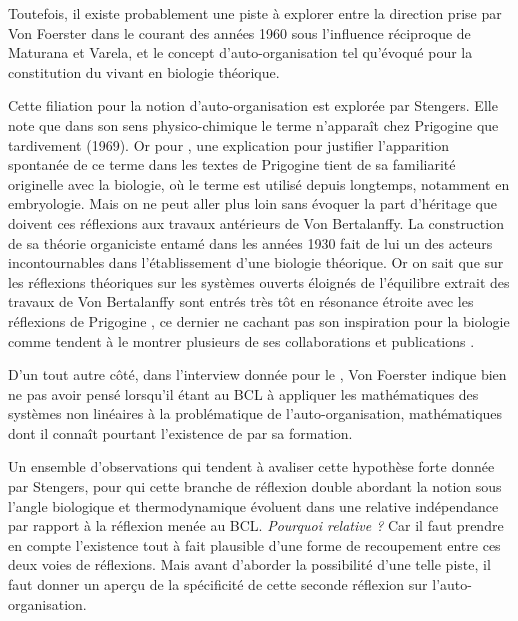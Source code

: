 Toutefois, il existe probablement une piste à explorer entre la direction prise par Von Foerster dans le courant des années 1960 sous l'influence réciproque de Maturana et Varela, et le concept d'auto-organisation tel qu'évoqué pour la constitution du vivant en biologie théorique. 

Cette filiation pour la notion d'auto-organisation est explorée par Stengers. Elle note que dans son sens physico-chimique le terme n’apparaît chez Prigogine que tardivement (1969). Or pour \textcite[64]{Stengers1985}, une explication pour justifier l'apparition spontanée de ce terme dans les textes de Prigogine tient de sa familiarité originelle avec la biologie, où le terme est utilisé depuis longtemps, notamment en embryologie. Mais on ne peut aller plus loin sans évoquer la part d'héritage que doivent ces réflexions aux travaux antérieurs de Von Bertalanffy. La construction de sa théorie organiciste  entamé dans les années 1930 fait de lui un des acteurs incontournables dans l'établissement d'une biologie théorique. Or on sait que sur les réflexions théoriques sur les systèmes ouverts éloignés de l'équilibre extrait des travaux de Von Bertalanffy sont entrés très tôt en résonance étroite \autocite[653-661]{Pouvreau2013} avec les réflexions de Prigogine \autocite{Prigogine1996}, ce dernier ne cachant pas son inspiration pour la biologie comme tendent à le montrer plusieurs de ses collaborations et publications \autocites[59-67]{Stengers1985}{Prigogine1946}.

D'un tout autre côté, dans l'interview donnée pour le \textcite[255]{CREA1985}, Von Foerster indique bien ne pas avoir pensé lorsqu'il étant au BCL à appliquer les mathématiques des systèmes non linéaires à la problématique de l'auto-organisation, mathématiques dont il connaît pourtant l'existence de par sa formation.


Un ensemble d'observations qui tendent à avaliser cette hypothèse forte donnée par Stengers, pour qui cette branche de réflexion double abordant la notion sous l'angle biologique et thermodynamique évoluent dans une relative indépendance par rapport à la réflexion menée au BCL. \textit{Pourquoi relative ?} Car il faut prendre en compte l'existence tout à fait plausible d'une forme de recoupement entre ces deux voies de réflexions. Mais avant d'aborder la possibilité d'une telle piste, il faut donner un aperçu de la spécificité de cette seconde réflexion sur l'auto-organisation.

